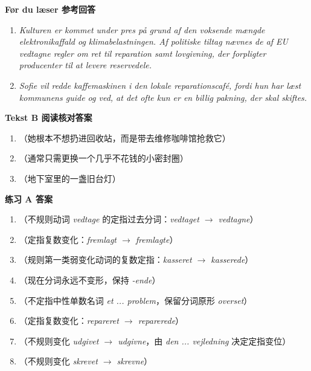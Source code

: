 \begin{answerbox}
\textbf{Før du læser 参考回答}
\begin{enumerate}
  \item \textit{Kulturen er kommet under pres på grund af den voksende mængde elektronikaffald og klimabelastningen. Af politiske tiltag nævnes de af EU vedtagne regler om ret til reparation samt lovgivning, der forpligter producenter til at levere reservedele.}
  \item \textit{Sofie vil redde kaffemaskinen i den lokale reparationscafé, fordi hun har læst kommunens guide og ved, at det ofte kun er en billig pakning, der skal skiftes.}
\end{enumerate}

\textbf{Tekst B 阅读核对答案}
\begin{enumerate}
  \item {}（她根本不想扔进回收站，而是带去维修咖啡馆抢救它）
  \item {}（通常只需更换一个几乎不花钱的小密封圈）
  \item {}（地下室里的一盏旧台灯）
\end{enumerate}

\textbf{练习 A 答案}
\begin{enumerate}
  \item {}（不规则动词 \textit{vedtage} 的定指过去分词：\textit{vedtaget $\rightarrow$ vedtagne}）
  \item {}（定指复数变化：\textit{fremlagt $\rightarrow$ fremlagte}）
  \item {}（规则第一类弱变化动词的复数定指：\textit{kasseret $\rightarrow$ kasserede}）
  \item {}（现在分词永远不变形，保持 \textit{-ende}）
  \item {}（不定指中性单数名词 \textit{et ... problem}，保留分词原形 \textit{overset}）
  \item {}（定指复数变化：\textit{repareret $\rightarrow$ reparerede}）
  \item {}（不规则变化 \textit{udgivet $\rightarrow$ udgivne}，由 \textit{den ... vejledning} 决定定指变位）
  \item {}（不规则变化 \textit{skrevet $\rightarrow$ skrevne}）
\end{enumerate}


\end{answerbox}
